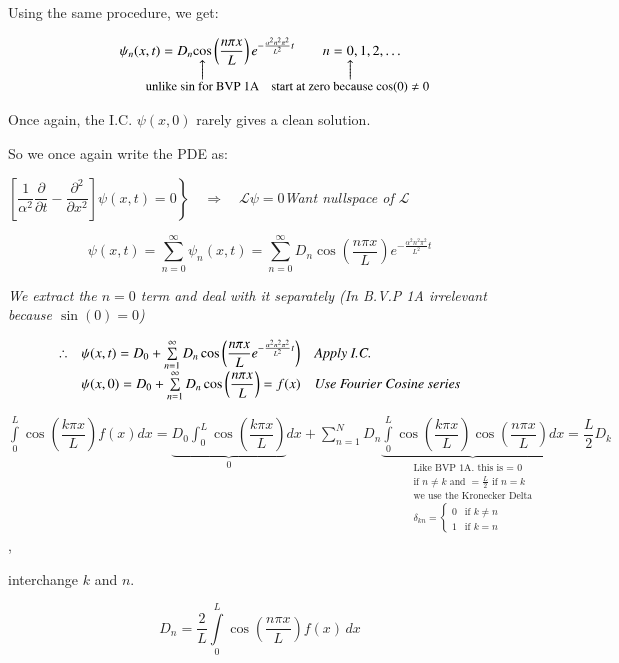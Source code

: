 \documentclass{report}
\makeatletter
\newcommand\parrow[3][3ex]{%
 \begin{array}[t]{@{}c@{}} #2 \\
  \left\uparrow\vcenter{\hrule height #1}\right.\kern-\nulldelimiterspace\\
  \makebox[0pt]{\small#3}
  \end{array}%
}
\makeatother
\begin{document}
Using the same procedure, we get:

$$\psi_n(x,t)=D_n\parrow{\cos}{unlike sin for BVP 1A}\left(\dfrac{n\pi x}{L}\right)e^{-\frac{\alpha^2n^2\pi^2}{L^2}t}\qquad n=\parrow{0}{start at zero because $\cos(0)\neq 0$},1,2,\ldots$$

Once again, the I.C. $\psi(x,0)$ rarely gives a clean solution.

So we once again write the PDE as:

$\left.\left[\dfrac{1}{\alpha^2}\dfrac{\partial}{\partial t}-\dfrac{\partial^2}{\partial x^2}\right]\psi(x,t)=0\right\}\quad\Rightarrow\quad \mathcal{L}\psi=0$\qquad \textit{Want nullspace of $\mathcal{L}$}

$$\psi(x,t)=\sum\limits_{n=0}^{\infty}\psi_n(x,t)=\sum\limits_{n=0}^{\infty}D_n\cos\left(\dfrac{n\pi x}{L}\right)e^{-\frac{\alpha^2n^2\pi^2}{L^2}t}$$

\textit{We extract the $n=0$ term and deal with it separately (In B.V.P 1A irrelevant because $\sin(0)=0$)}

$$\begin{array}{lll}
    \therefore & \psi(x,t)=D_0+\sum\limits_{n=1}^{\infty}D_n\cos\left(\dfrac{n\pi x}{L}e^{-\frac{\alpha^2n^2\pi^2}{L^2}t}\right) & \text{\textit{Apply I.C.}}  \\
     & \psi(x,0)=D_0+\sum\limits_{n=1}^{\infty}D_n\cos\left(\dfrac{n\pi x}{L}\right) =f(x) & \text{\textit{Use Fourier Cosine series}}
\end{array}$$

$\displaystyle\int\limits_0^L\cos\left(\dfrac{k\pi x}{L}\right)f(x)dx=\underbrace{D_0\displaystyle\int_0^L\cos\left(\dfrac{k\pi x}{L}\right)}_{0}dx+\sum\limits_{n=1}^ND_n\underbrace{\displaystyle\int\limits_{0}^L\cos\left(\dfrac{k\pi x}{L}\right)\cos\left(\dfrac{n\pi x}{L}\right)dx}_{\substack{\text{Like BVP 1A. this is = 0}\\
\text{if $n\neq k$ and $=\frac{L}{2}$ if $n=k$}\\
\text{we use the Kronecker Delta}\\
\delta_{kn}=\left\{\begin{array}{ll}
     0 & \text{if } k\neq n  \\
     1 & \text{if } k=n 
\end{array}\right.}}=\dfrac{L}{2}D_k$,

interchange $k$ and $n$.

\begin{equation}\label{eq_1}
    \boxed{
        D_n = \dfrac{2}{L} \int\limits_0^L \cos\left(\dfrac{n\pi x}{L}\right) f(x) \, dx
    }
\end{equation}
\end{document}

